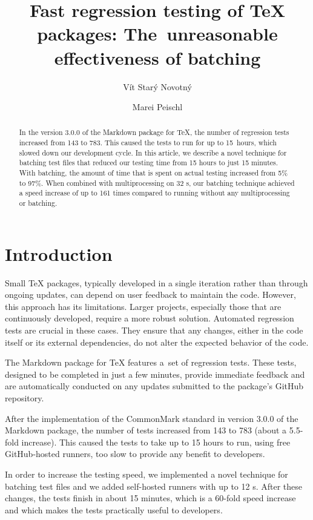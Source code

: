 \documentclass[final]{ltugboat}
\title{Fast regression testing of \TeX{} packages: The~unreasonable effectiveness of batching}
\author{Vít Starý Novotný}
\author{Marei Peischl}
\begin{document}
\maketitle

\begin{abstract}
In the version 3.0.0 of the Markdown package for \TeX, the number of regression tests increased from 143 to 783. This caused the tests to run for up to 15~hours, which slowed down our development cycle.
In this article, we describe a novel technique for batching test files that reduced our testing time from 15 hours to just 15 minutes. With batching, the amount of time that is spent on actual testing increased from 5\% to 97\%. When combined with multiprocessing on 32 s, our batching technique achieved a speed increase of up to 161 times compared to running without any multiprocessing or batching.
\end{abstract}

\section{Introduction}
Small \TeX{} packages, typically developed in a single iteration rather than through ongoing updates, can depend on user feedback to maintain the code. However, this approach has its limitations. Larger projects, especially those that are continuously developed, require a more robust solution. Automated regression tests are crucial in these cases. They ensure that any changes, either in the code itself or its external dependencies, do not alter the expected behavior of the code.

The Markdown package for \TeX{} features a~set of regression tests. These tests, designed to be completed in just a few minutes, provide immediate feedback and are automatically conducted on any updates submitted to the package's GitHub repository.

After the implementation of the CommonMark standard in version 3.0.0 of the Markdown package, the number of tests increased from 143 to 783 (about a 5.5-fold increase). This caused the tests to take up to 15 hours to run, using free GitHub-hosted runners, too slow to provide any benefit to developers.

In order to increase the testing speed, we implemented a novel technique for batching test files and we added self-hosted runners with up to 12 s. After these changes, the tests finish in about 15 minutes, which is a 60-fold speed increase and which makes the tests practically useful to developers.
\end{document}
